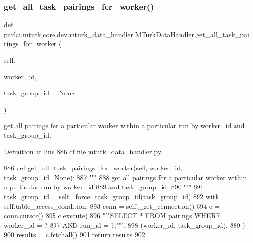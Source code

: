 \subsubsection{\texorpdfstring{get\+\_\+all\+\_\+task\+\_\+pairings\+\_\+for\+\_\+worker()}{get\_all\_task\_pairings\_for\_worker()}}
{\footnotesize\ttfamily def parlai.\+mturk.\+core.\+dev.\+mturk\+\_\+data\+\_\+handler.\+M\+Turk\+Data\+Handler.\+get\+\_\+all\+\_\+task\+\_\+pairings\+\_\+for\+\_\+worker (\begin{DoxyParamCaption}\item[{}]{self,  }\item[{}]{worker\+\_\+id,  }\item[{}]{task\+\_\+group\+\_\+id = {\ttfamily None} }\end{DoxyParamCaption})}

\begin{DoxyVerb}get all pairings for a particular worker within a particular run by worker_id
and task_group_id.
\end{DoxyVerb}
 

Definition at line 886 of file mturk\+\_\+data\+\_\+handler.\+py.


\begin{DoxyCode}
886     \textcolor{keyword}{def }get\_all\_task\_pairings\_for\_worker(self, worker\_id, task\_group\_id=None):
887         \textcolor{stringliteral}{"""}
888 \textcolor{stringliteral}{        get all pairings for a particular worker within a particular run by worker\_id}
889 \textcolor{stringliteral}{        and task\_group\_id.}
890 \textcolor{stringliteral}{        """}
891         task\_group\_id = self.\_force\_task\_group\_id(task\_group\_id)
892         with self.table\_access\_condition:
893             conn = self.\_get\_connection()
894             c = conn.cursor()
895             c.execute(
896                 \textcolor{stringliteral}{"""SELECT * FROM pairings WHERE worker\_id = ?}
897 \textcolor{stringliteral}{                         AND run\_id = ?;"""},
898                 (worker\_id, task\_group\_id),
899             )
900             results = c.fetchall()
901             \textcolor{keywordflow}{return} results
902 
\end{DoxyCode}
\mbox{\label{classparlai_1_1mturk_1_1core_1_1dev_1_1mturk__data__handler_1_1MTurkDataHandler_a3e7435a5ea6af94b4d668c095184a234}} 
